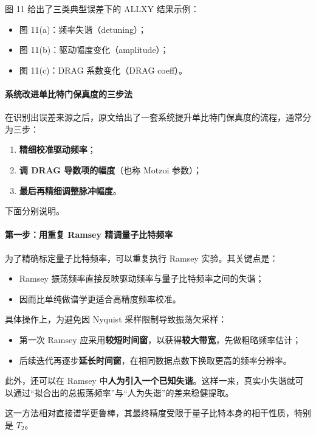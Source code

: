 \documentclass[12pt,a4paper,oneside]{ctexbook}
\begin{document}
图 11 给出了三类典型误差下的 ALLXY 结果示例：
\begin{itemize}
    \item 图 11(a)：频率失谐（detuning）；
    \item 图 11(b)：驱动幅度变化（amplitude）；
    \item 图 11(c)：DRAG 系数变化（DRAG coeff）。
\end{itemize}

\paragraph{系统改进单比特门保真度的三步法}
在识别出误差来源之后，原文给出了一套系统提升单比特门保真度的流程，通常分为三步：

\begin{enumerate}
    \item \textbf{精细校准驱动频率}；
    \item \textbf{调 DRAG 导数项的幅度}（也称 Motzoi 参数）；
    \item \textbf{最后再精细调整脉冲幅度}。
\end{enumerate}

下面分别说明。

\paragraph{第一步：用重复 Ramsey 精调量子比特频率}
为了精确标定量子比特频率，可以重复执行 Ramsey 实验。其关键点是：
\begin{itemize}
    \item Ramsey 振荡频率直接反映驱动频率与量子比特频率之间的失谐；
    \item 因而比单纯做谱学更适合高精度频率校准。
\end{itemize}

具体操作上，为避免因 Nyquist 采样限制导致振荡欠采样：
\begin{itemize}
    \item 第一次 Ramsey 应采用\textbf{较短时间窗}，以获得\textbf{较大带宽}，先做粗略频率估计；
    \item 后续迭代再逐步\textbf{延长时间窗}，在相同数据点数下换取更高的频率分辨率。
\end{itemize}

此外，还可以在 Ramsey 中\textbf{人为引入一个已知失谐}。这样一来，真实小失谐就可以通过“拟合出的总振荡频率”与“人为失谐”的差来稳健提取。

这一方法相对直接谱学更鲁棒，其最终精度受限于量子比特本身的相干性质，特别是 \(T_2\)。
\end{document}
